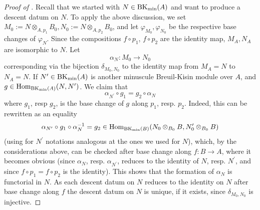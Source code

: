 \documentclass{amsart}
\theoremstyle{plain}
\theoremstyle{definition}
\begin{document}
\begin{proof}[Proof of ]
Recall that we started with $N \in \mathrm{BK}_{\rm min}(A)$ and want to produce a descent datum on $N$. To apply the above discussion, we set $M_0:=N\otimes_{A,p_1}B_0, N_0:=N\otimes_{A,p_2} B_0$, and let $\varphi_{M_0}, \varphi_{N_0}$ be the respective base changes of $\varphi_N$. Since the compositions $f\circ p_1$, $f\circ p_2$ are the identity map, $M_A, N_A$ are isomorphic to $N$. Let
$$
\alpha_N \colon M_0 \to N_0
$$
corresponding via the bijection $\delta_{M_0,N_0}$ to the identity map from $M_A=N$ to $N_A=N$. If $N^\prime \in \mathrm{BK}_{\rm min}(A)$ is another minuscule Breuil-Kisin module over $A$, and $g\in \mathrm{Hom}_{\mathrm{BK}_{\rm min}(A)} (N, N^\prime)$. We claim that
$$
\alpha_{N^\prime} \circ g_1 = g_2 \circ \alpha_N 
$$
where $g_1$, resp $g_2$, is the base change of $g$ along $p_1$, resp. $p_2$. Indeed, this can be rewritten as an equality
$$
\alpha_{N^\prime} \circ g_1 \circ \alpha_N^{-1} = g_2 \in \mathrm{Hom}_{\mathrm{BK}_{\rm min}(B)} (N_0 \otimes_{B_0} B, N_0^\prime \otimes_{B_0} B)
$$
(using for $N^\prime$ notations analogous at the ones we used for $N$), which, by the considerations above, can be checked after base change along $f: B \to A$, where it becomes obvious (since $\alpha_N$, resp. $\alpha_{N^\prime}$, reduces to the identity of $N$, resp. $N^\prime$, and since $f\circ p_1=f\circ p_2$ is the identity). This shows that the formation of $\alpha_N$ is functorial in $N$. As each descent datum on $N$ reduces to the identity on $N$ after base change along $f$ the descent datum on $N$ is unique, if it exists, since $\delta_{M_0,N_0}$ is injective.



\end{proof}
\end{document}
